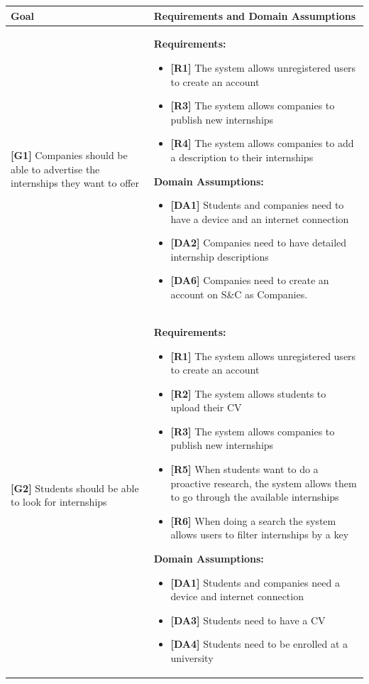 \begin{longtable}{|p{}|p{}|}
\hline
\textbf{Goal} & \textbf{Requirements and Domain Assumptions} \\
\hline
\textbf{[G1]} Companies should be able to advertise the internships they want to offer 
& 
\textbf{Requirements:}
\begin{itemize}
     \item \textbf{[R1]} The system allows unregistered users to create an account
    \item \textbf{[R3]} The system allows companies to publish new internships
    \item \textbf{[R4]} The system allows companies to add a description to their internships
\end{itemize}
\textbf{Domain Assumptions:}
\begin{itemize}
    \item \textbf{[DA1]} Students and companies need to have a device and an internet connection
    \item \textbf{[DA2]} Companies need to have detailed internship descriptions
    \item \textbf{[DA6]} Companies need to create an account on S\&C as Companies.
\end{itemize} \\
\hline
\textbf{[G2]} Students should be able to look for internships 
& 
\textbf{Requirements:}
\begin{itemize}
     \item \textbf{[R1]} The system allows unregistered users to create an account
    \item \textbf{[R2]} The system allows students to upload their CV
    \item \textbf{[R3]} The system allows companies to publish new internships
    \item \textbf{[R5]} When students want to do a proactive research, the system allows them to go through the available internships
    \item \textbf{[R6]} When doing a search the system allows users to filter internships by a key
\end{itemize}
\textbf{Domain Assumptions:}
\begin{itemize}
    \item \textbf{[DA1]} Students and companies need a device and internet connection
    \item \textbf{[DA3]} Students need to have a CV
     \item \textbf{[DA4]} Students need to be enrolled at a university

\end{itemize}
\end{longtable}
